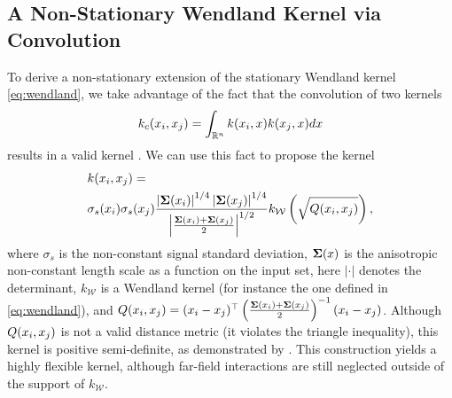 \documentclass{article}
\renewcommand{\mathbf}[1]{%
  \ifx#1x x\else \textbf{#1}\fi
}
\begin{document}
\subsection{A Non-Stationary Wendland Kernel via Convolution}
To derive a non-stationary extension of the stationary Wendland kernel \eqref{eq:wendland}, we take advantage of the fact that the convolution of two kernels \begin{equation}
    k_c(\mathbf{x}_i, \mathbf{x}_j) = \int_{\mathbb{R}^n} k(\mathbf{x}_i, \mathbf{x}) k(\mathbf{x}_j, \mathbf{x}) d\mathbf{x}
\end{equation}
results in a valid kernel \citep{paciorek2006spatial, risser2020bayesian, higdon1999non}. We can use this fact to propose the kernel
\begin{align} \label{eq:wendconv}
\small
    &k(\mathbf{x}_i,\mathbf{x}_j) = \nonumber \\
    &\sigma_s(\mathbf{x}_i) \sigma_s(\mathbf{x}_j) \frac{\left|\boldsymbol{\Sigma}(\mathbf{x}_i)\right|^{1/4}\left|\boldsymbol{\Sigma}(\mathbf{x}_j)\right|^{1/4}}{\left|\frac{\boldsymbol{\Sigma}(\mathbf{x}_i) + \boldsymbol{\Sigma}(\mathbf{x}_j)}{2} \right|^{1/2}} k_{\mathcal{W}}\left({\sqrt{Q(\mathbf{x}_i,\mathbf{x}_j)}}\right),
\end{align}
where $\sigma_s$ is the non-constant signal standard deviation, $\boldsymbol{\Sigma}(\mathbf{x})$ is the anisotropic non-constant length scale as a function on the input set, here $|\cdot|$ denotes the determinant, $k_{\mathcal{W}}$ is a Wendland kernel (for instance the one defined in \ref{eq:wendland}), and $Q(\mathbf{x}_i,\mathbf{x}_j)={(\mathbf{x}_i-\mathbf{x}_j)^\top \left( \frac{\boldsymbol{\Sigma}(\mathbf{x}_i) + \boldsymbol{\Sigma}(\mathbf{x}_j)}{2}\right)^{-1}(\mathbf{x}_i-\mathbf{x}_j)}$. Although $Q(\mathbf{x}_i,\mathbf{x}_j)$ is not a valid distance metric (it violates the triangle inequality), this kernel is positive semi-definite, as demonstrated by \cite{paciorek2006spatial}. This construction yields a highly flexible kernel, although far-field interactions are still neglected outside of the support of $k_{\mathcal{W}}$.
\end{document}
